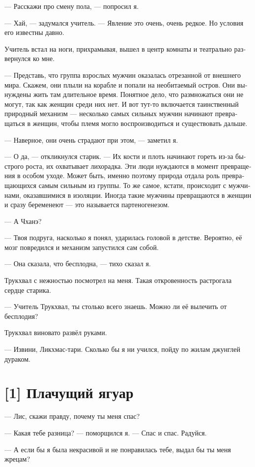 \documentclass[a4paper,12pt,fleqn]{book}\usepackage{cooltooltips}\usepackage{polyglossia}\setdefaultlanguage[babelshorthands=true]{russian}\setotherlanguage{english}\defaultfontfeatures{Ligatures=TeX,Mapping=tex-text} \usepackage{xcolor}\definecolor{lightgray}{HTML}{bbbbbb}\color{lightgray}\newcommand{\ml}[3]{\textenglish{\textcolor{black}{#3}}}
\begin{document}
{--- Расскажи про смену пола, --- попросил я.

--- Хай, --- задумался учитель. --- Явление это очень, очень редкое.
Но условия его известны давно.

Учитель встал на ноги, прихрамывая, вышел в центр комнаты и театрально развернулся ко мне.

--- Представь, что группа взрослых мужчин оказалась отрезанной от внешнего мира.
Скажем, они плыли на корабле и попали на необитаемый остров.
Они вынуждены жить там длительное время.
Понятное дело, что размножаться они не могут, так как женщин среди них нет.
И вот тут-то включается таинственный природный механизм --- несколько самых сильных мужчин начинают превращаться в женщин, чтобы племя могло воспроизводиться и существовать дальше.

--- Наверное, они очень страдают при этом, --- заметил я.

--- О да, --- откликнулся старик.
--- Их кости и плоть начинают гореть из-за быстрого роста, их охватывает лихорадка.
Эти люди нуждаются в момент превращения в особом уходе.
Может быть, именно поэтому природа отдала роль превращающихся самым сильным из группы.
То же самое, кстати, происходит с мужчинами, оказавшимися в изоляции.
Иногда такие мужчины превращаются в женщин и сразу беременеют --- это называется партеногенезом.

--- А Чханэ?

--- Твоя подруга, насколько я понял, ударилась головой в детстве.
Вероятно, её мозг повредился и механизм запустился сам собой.

--- Она сказала, что бесплодна, --- тихо сказал я.

Трукхвал с нежностью посмотрел на меня.
Такая откровенность растрогала сердце старика.

--- Учитель Трукхвал, ты столько всего знаешь.
Можно ли её вылечить от бесплодия?

Трукхвал виновато развёл руками.

--- Извини, Ликхмас-тари.
Сколько бы я ни учился, пойду по жилам джунглей дураком.

\section{[1] Плачущий ягуар}

--- Лис, скажи правду, почему ты меня спас?

--- Какая тебе разница? --- поморщился я.
--- Спас и спас.
Радуйся.

--- А если бы я была некрасивой и не понравилась тебе, выдал бы ты меня жрецам?

}
\end{document}
